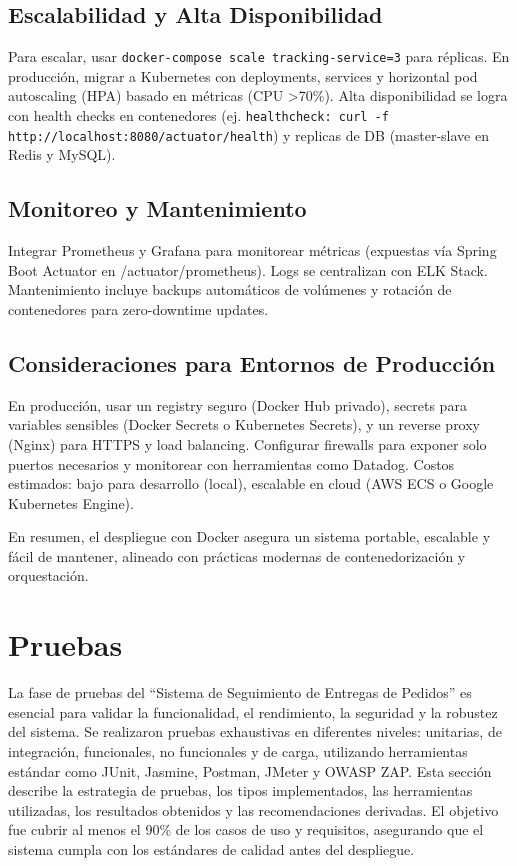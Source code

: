 \documentclass[a4paper,12pt]{article}
\begin{document}
\subsection{Escalabilidad y Alta Disponibilidad}
Para escalar, usar \texttt{docker-compose scale tracking-service=3} para réplicas. En producción, migrar a Kubernetes con deployments, services y horizontal pod autoscaling (HPA) basado en métricas (CPU >70\%). Alta disponibilidad se logra con health checks en contenedores (ej. \texttt{healthcheck: curl -f http://localhost:8080/actuator/health}) y replicas de DB (master-slave en Redis y MySQL).

\subsection{Monitoreo y Mantenimiento}
Integrar Prometheus y Grafana para monitorear métricas (expuestas vía Spring Boot Actuator en /actuator/prometheus). Logs se centralizan con ELK Stack. Mantenimiento incluye backups automáticos de volúmenes y rotación de contenedores para zero-downtime updates.

\subsection{Consideraciones para Entornos de Producción}
En producción, usar un registry seguro (Docker Hub privado), secrets para variables sensibles (Docker Secrets o Kubernetes Secrets), y un reverse proxy (Nginx) para HTTPS y load balancing. Configurar firewalls para exponer solo puertos necesarios y monitorear con herramientas como Datadog. Costos estimados: bajo para desarrollo (local), escalable en cloud (AWS ECS o Google Kubernetes Engine).

En resumen, el despliegue con Docker asegura un sistema portable, escalable y fácil de mantener, alineado con prácticas modernas de contenedorización y orquestación.
\section{Pruebas}

La fase de pruebas del ``Sistema de Seguimiento de Entregas de Pedidos'' es esencial para validar la funcionalidad, el rendimiento, la seguridad y la robustez del sistema. Se realizaron pruebas exhaustivas en diferentes niveles: unitarias, de integración, funcionales, no funcionales y de carga, utilizando herramientas estándar como JUnit, Jasmine, Postman, JMeter y OWASP ZAP. Esta sección describe la estrategia de pruebas, los tipos implementados, las herramientas utilizadas, los resultados obtenidos y las recomendaciones derivadas. El objetivo fue cubrir al menos el 90\% de los casos de uso y requisitos, asegurando que el sistema cumpla con los estándares de calidad antes del despliegue.
\end{document}
